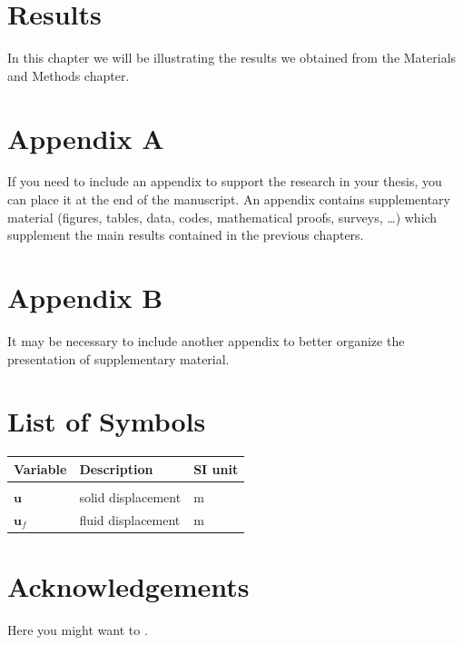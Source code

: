 \documentclass{Configuration_Files/PoliMi3i_thesis}
\begin{document}
\chapter{Results}

In this chapter we will be illustrating the results we obtained from the Materials and
Methods chapter.



\cleardoublepage
{} %
\appendix
\chapter{Appendix A}
If you need to include an appendix to support the research in your thesis, you can place it at the end of the manuscript.
An appendix contains supplementary material (figures, tables, data, codes, mathematical proofs, surveys, \dots)
which supplement the main results contained in the previous chapters.

\chapter{Appendix B}
It may be necessary to include another appendix to better organize the presentation of supplementary material.


\listoffigures

\listoftables

\chapter*{List of Symbols} %
\begin{table}[H]
    \centering
    \begin{tabular}{lll}
        \textbf{Variable} & \textbf{Description} & \textbf{SI unit} \\\hline\\[-9px]
        $\bm{u}$ & solid displacement & m \\[2px]
        $\bm{u}_f$ & fluid displacement & m \\[2px]
    \end{tabular}
\end{table}

\chapter*{Acknowledgements}
Here you might want to .


\cleardoublepage
\end{document}
